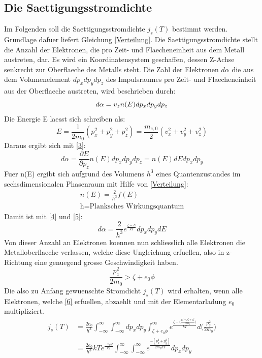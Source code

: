 \subsection{Die Saettigungsstromdichte}
Im Folgenden soll die Saettigungsstromdichte $j_s(T)$ bestimmt werden. Grundlage dafuer liefert Gleichung \ref{Verteilung}. Die Saettigungsstromdichte stellt die Anzahl der Elektronen, die pro Zeit- und Flaecheneinheit aus dem Metall austreten, dar. Es wird ein Koordinatensystem geschaffen, dessen Z-Achse senkrecht zur Oberflaeche des Metalls steht. Die Zahl der Elektronen $d\alpha$ die aus dem Volumenelement $dp_xdp_ydp_z$ des Impulsraumes pro Zeit- und Flaecheneinheit aus der Oberflaeche austreten, wird beschrieben durch:
\begin{equation}
    d\alpha=v_zn(E)dp_xdp_ydp_z \label{3}\\
\end{equation}
Die Energie E laesst sich schreiben als:
\begin{equation}
    E=\frac{1}{2m_0}(p_x^2+p_y^2+p_z^2)=\frac{m_{e,0}}{2}(v_x^2+v_y^2+v_z^2)
\end{equation}
Daraus ergibt sich mit \ref{3}:
\begin{equation}
    d\alpha=\frac{\partial E}{\partial p_z}n(E)dp_xdp_ydp_z=n(E)dEdp_xdp_y \label{4}
\end{equation}
Fuer n(E) ergibt sich aufgrund des Volumens $h^3$ eines Quantenzustandes im sechsdimensionalen Phasenraum mit Hilfe von \ref{Verteilung}:
\begin{align}
    n(E)=\frac{2}{h^3}f(E) \label{5}\\
    \text{h=Planksches Wirkungsquantum}\nonumber
\end{align}
Damit ist mit \ref{4} und \ref{5}:
\begin{equation}
    d\alpha=\frac{2}{h^3}e^{\frac{\zeta-E}{kT}}dp_xdp_ydE \nonumber
\end{equation}
Von dieser Anzahl an Elektronen koennen nun schliesslich alle Elektronen die Metalloberflaeche verlassen, welche diese Ungleichung erfuellen, also in z-Richtung eine genuegend grosse Geschwindigkeit haben. 
\begin{equation}
    \frac{p_z^2}{2m_0}>\zeta+e_0\phi \label{6}
\end{equation}
Die also zu Anfang gewuenschte Stromdicht $j_s(T)$ wird erhalten, wenn alle Elektronen, welche \ref{6} erfuellen, abzaehlt und mit der Elementarladung $e_0$ multipliziert. 
\begin{align*}
j_s(T)&=\frac{2e_0}{h^3}\int_{-\infty}^{\infty} \int_{-\infty}^{\infty} dp_xdp_y \int_{\zeta+e_0\phi}^{\infty}e^{\frac{\zeta-\bigg(\frac{p_x^2+p_y^2+p_z^2}{2m_0}\bigg)}{kT}}d\Big(\frac{p_z^2}{2m_0}\Big)\\
&=\frac{2e_0}{h^3}kTe^{\frac{-e_0\phi}{kT}}\int_{-\infty}^{\infty} \int_{-\infty}^{\infty}e^{\frac{-(p_x^2+p_y^2)}{2m_0kT}}dp_xdp_y
\end{align*}
